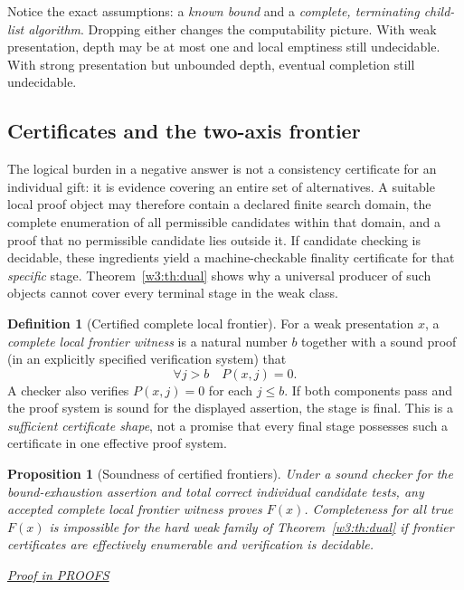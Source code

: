 \documentclass[11pt,letterpaper]{article}
\newtheorem{proposition}[theorem]{Proposition}
\theoremstyle{definition}\newtheorem{definition}[theorem]{Definition}\newtheorem{example}[theorem]{Example}
\theoremstyle{remark}\newtheorem{remark}[theorem]{Remark}
\newcommand{\prooflink}[1]{\par\noindent\hfill\small\hyperref[#1]{\textit{Proof in PROOFS}}\normalsize}
\begin{document}
Notice the exact assumptions: a \emph{known bound} and a \emph{complete, terminating child-list algorithm}. Dropping either changes the computability picture. With weak presentation, depth may be at most one and local emptiness still undecidable. With strong presentation but unbounded depth, eventual completion still undecidable.

\subsection{Certificates and the two-axis frontier}
The logical burden in a negative answer is not a consistency certificate for an individual gift: it is evidence covering an entire set of alternatives. A suitable local proof object may therefore contain a declared finite search domain, the complete enumeration of all permissible candidates within that domain, and a proof that no permissible candidate lies outside it. If candidate checking is decidable, these ingredients yield a machine-checkable finality certificate for that \emph{specific} stage. Theorem~\ref{w3:th:dual} shows why a universal producer of such objects cannot cover every terminal stage in the weak class.

\begin{definition}[Certified complete local frontier]\label{w3:def:frontier}
For a weak presentation $x$, a \emph{complete local frontier witness} is a natural number $b$ together with a sound proof (in an explicitly specified verification system) that
\[
 \forall j>b\quad P(x,j)=0.
\]
A checker also verifies $P(x,j)=0$ for each $j\le b$. If both components pass and the proof system is sound for the displayed assertion, the stage is final. This is a \emph{sufficient certificate shape}, not a promise that every final stage possesses such a certificate in one effective proof system.
\end{definition}

\begin{proposition}[Soundness of certified frontiers]\label{w3:prop:frontier}
Under a sound checker for the bound-exhaustion assertion and total correct individual candidate tests, any accepted complete local frontier witness proves $F(x)$. Completeness for all true $F(x)$ is impossible for the hard weak family of Theorem~\ref{w3:th:dual} if frontier certificates are effectively enumerable and verification is decidable.
\prooflink{w3:pr:frontier}
\end{proposition}
\end{document}
